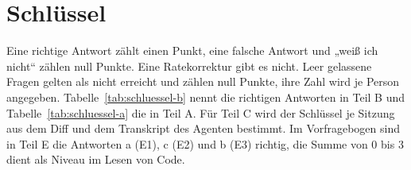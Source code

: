 \section{Schlüssel}
\label{app:schluessel}

Eine richtige Antwort zählt einen Punkt, eine falsche Antwort und „weiß ich nicht“ zählen null Punkte. Eine Ratekorrektur gibt es nicht. Leer gelassene Fragen gelten als nicht erreicht und zählen null Punkte, ihre Zahl wird je Person angegeben. Tabelle~\ref{tab:schluessel-b} nennt die richtigen Antworten in Teil B und Tabelle~\ref{tab:schluessel-a} die in Teil A. Für Teil C wird der Schlüssel je Sitzung aus dem Diff und dem Transkript des Agenten bestimmt. Im Vorfragebogen sind in Teil E die Antworten a (E1), c (E2) und b (E3) richtig, die Summe von 0 bis 3 dient als Niveau im Lesen von Code.

